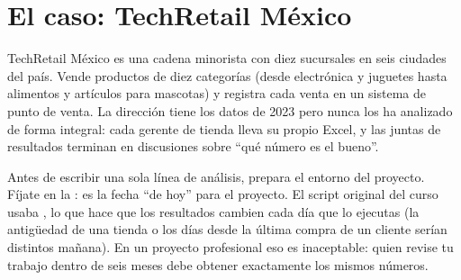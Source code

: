 \section{El caso: TechRetail México}
\label{sec:m09-caso}

TechRetail México es una cadena minorista con diez sucursales en seis
ciudades del país. Vende productos de diez categorías (desde electrónica y
juguetes hasta alimentos y artículos para mascotas) y registra cada venta en
un sistema de punto de venta. La dirección tiene los datos de 2023 pero nunca
los ha analizado de forma integral: cada gerente de tienda lleva su propio
Excel, y las juntas de resultados terminan en discusiones sobre ``qué número
es el bueno''.

Antes de escribir una sola línea de análisis, prepara el entorno del
proyecto. Fíjate en la : es la fecha ``de hoy'' para
el proyecto. El script original del curso usaba , lo que
hace que los resultados cambien cada día que lo ejecutas (la antigüedad de
una tienda o los días desde la última compra de un cliente serían distintos
mañana). En un proyecto profesional eso es inaceptable: quien revise tu
trabajo dentro de seis meses debe obtener exactamente los mismos números.

